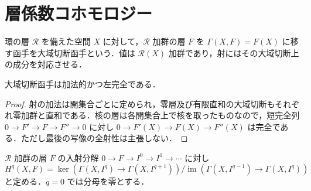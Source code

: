 \section{層係数コホモロジー}
\begin{defn}[大域切断函手]
環の層 $\mathcal R$ を備えた空間 $X$ に対して，$\mathcal R$ 加群の層 $F$ を $\Gamma(X,F)=F(X)$ に移す函手を大域切断函手という．値は $\mathcal R(X)$ 加群であり，射にはその大域切断上の成分を対応させる．
\end{defn}
\begin{prop}[大域切断の左完全性]
大域切断函手は加法的かつ左完全である．
\end{prop}
\begin{proof}
射の加法は開集合ごとに定められ，零層及び有限直和の大域切断もそれぞれ零加群と直和である．核の層は各開集合上で核を取ったものなので，短完全列 $0\to F'\to F\to F''\to0$ に対し $0\to F'(X)\to F(X)\to F''(X)$ は完全である．ただし最後の写像の全射性は主張しない．
\end{proof}
\begin{defn}[層係数コホモロジー]
$\mathcal R$ 加群の層 $F$ の入射分解 $0\to F\to I^0\to I^1\to\cdots$ に対し
\[
 H^q(X,F)=\ker(\Gamma(X,I^q)\to\Gamma(X,I^{q+1}))/\operatorname{im}(\Gamma(X,I^{q-1})\to\Gamma(X,I^q))
\]
と定める．$q=0$ では分母を零とする．
\end{defn}
